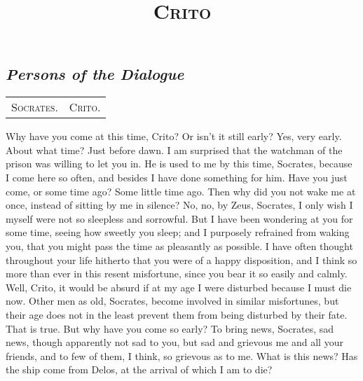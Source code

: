 \documentclass[letterpaper,12pt]{article}
\title{\vspace{-2.5cm} \scshape Crito \vspace{-8mm}}
\author{}
\date{
	\vspace{-1em}
		\small \fontfamily{ppl}\selectfont Written by Plato, translated by Harold North Fowler, 1966
	\begin{center}
		$\mathsection$
	\end{center}
		\vspace{-2em}
	}
\newenvironment{setting}
	{
		\setlength{\tabcolsep}{3em}
		\begin{center}
			\section*{\normalsize \fontfamily{ppl}\selectfont \itshape \bfseries Persons of the Dialogue\vspace{-1mm}}
			\par
			\begin{tabular}{cc}
	}
	{
			\end{tabular}
		\end{center}
		\par \fontfamily{ppl}\selectfont{\small \textbf{Scene:} \textit{The Prison of Socrates.}}
		
		\hrulefill
	}
\begin{document}

\begin{minipage}{15.45cm}
\maketitle

\begin{setting}
	\textsc{Socrates.}	&	\textsc{Crito.}
\end{setting}
\end{minipage}
\begin{drama}
\setlength{\parindent}{2em}

\socratesspeaks 
{}Why have you come at this time, Crito? Or isn't it still early?
\critospeaks Yes, very early.
\socratesspeaks 
About what time?
\critospeaks 
Just before dawn.
\socratesspeaks 
I am surprised that the watchman of the prison was willing to let you in.
\critospeaks 
He is used to me by this time, Socrates, because I come here so often, and besides I have done something for him.
\socratesspeaks 
Have you just come, or some time ago?
\critospeaks 
Some little time ago. 
\socratesspeaks 
Then why did you not wake me at once, instead of sitting by me in silence?
\critospeaks 
No, no, by Zeus, Socrates, I only wish I myself were not so sleepless and sorrowful. But I have been wondering at you for some time, seeing how sweetly you sleep; and I purposely refrained from waking you, that you might pass the time as pleasantly as possible. I have often thought throughout your life hitherto that you were of a happy disposition, and I think so more than ever in this resent misfortune, since you bear it so easily and calmly.
\socratesspeaks 
Well, Crito, it would be absurd  if at my age I were disturbed because I must die now.
\critospeaks 
Other men as old, Socrates, become involved in similar misfortunes, but their age does not in the least prevent them from being disturbed by their fate.
\socratesspeaks 
That is true. But why have you come so early?
\critospeaks 
To bring news, Socrates, sad news, though apparently not sad to you, but sad and grievous me and all your friends, and to few of them, I think, so grievous as to me.
\socratesspeaks 
What is this news? Has the ship come from Delos,  at the arrival of which I am to die?

\end{drama}
\end{document}
